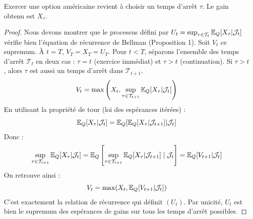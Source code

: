 Exercer une option américaine revient à choisir un temps d'arrêt $\tau$.  
Le gain obtenu est $X_\tau$.  
\begin{proof}
Nous devons montrer que le processus défini par $U_t = \sup_{\tau \in \mathcal{T}_t} \mathbb{E}_Q[X_\tau | \mathcal{J}_t]$ vérifie bien l'équation de récurrence de Bellman (Proposition 1).
Soit $V_t$ ce supremum.
À $t=T$, $V_T = X_T = U_T$.
Pour $t < T$, séparons l'ensemble des temps d'arrêt $\mathcal{T}_t$ en deux cas : $\tau = t$ (exercice immédiat) et $\tau > t$ (continuation).
Si $\tau > t$, alors $\tau$ est aussi un temps d'arrêt dans $\mathcal{T}_{t+1}$.
\[
V_t = \max \left( X_t, \sup_{\tau \in \mathcal{T}_{t+1}} \mathbb{E}_Q[X_\tau | \mathcal{J}_t] \right)
\]
En utilisant la propriété de tour (loi des espérances itérées) :
\[
\mathbb{E}_Q[X_\tau | \mathcal{J}_t] = \mathbb{E}_Q [ \mathbb{E}_Q[X_\tau | \mathcal{J}_{t+1}] | \mathcal{J}_t ]
\]
Donc :
\[
\sup_{\tau \in \mathcal{T}_{t+1}} \mathbb{E}_Q[X_\tau | \mathcal{J}_t] = \mathbb{E}_Q \left[ \sup_{\tau \in \mathcal{T}_{t+1}} \mathbb{E}_Q[X_\tau | \mathcal{J}_{t+1}] \mid \mathcal{J}_t \right] = \mathbb{E}_Q[V_{t+1} | \mathcal{J}_t]
\]
On retrouve ainsi :
\[
V_t = \max(X_t, \mathbb{E}_Q[V_{t+1} | \mathcal{J}_t])
\]
C'est exactement la relation de récurrence qui définit $(U_t)$. Par unicité, $U_t$ est bien le supremum des espérances de gains sur tous les temps d'arrêt possibles.
\end{proof}
